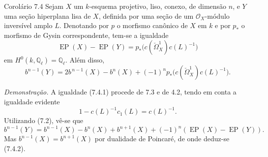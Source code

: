 \begin{statement}{Corolário 7.4}
Sejam $X$ um $k$-esquema projetivo, liso, conexo, de dimensão $n$, e $Y$ uma seção hiperplana lisa de $X$, definida por uma seção de um $\mathcal O_X$-módulo inversível amplo $L$. Denotando por $p$ o morfismo canônico de $X$ em $k$ e por $p_*$ o morfismo de Gysin correspondente, tem-se a igualdade
\[
\operatorname{EP}(X)-\operatorname{EP}(Y)=p_*\bigl(c(\check\Omega_X^1)c(L)^{-1}\bigr)
\tag{7.4.1}
\]
em $H^0(k,\mathbb Q_\ell)=\mathbb Q_\ell$. Além disso,
\[
b^{n-1}(Y)=2b^{\,n-1}(X)-b^n(X)+(-1)^n p_*\bigl(c(\check\Omega_X^1)c(L)^{-1}\bigr).
\tag{7.4.2}
\]
\end{statement}

\emph{Demonstração.} A igualdade (7.4.1) procede de 7.3 e de 4.2, tendo em conta a igualdade evidente
\[
1-c(L)^{-1}c_1(L)=c(L)^{-1}.
\]
Utilizando (7.2), vê-se que
\[
b^{n-1}(Y)=b^{n-1}(X)-b^n(X)+b^{n+1}(X)+(-1)^n(\operatorname{EP}(X)-\operatorname{EP}(Y)).
\]
Mas $b^{n-1}(X)=b^{n+1}(X)$ por dualidade de Poincaré, de onde deduz-se (7.4.2).
